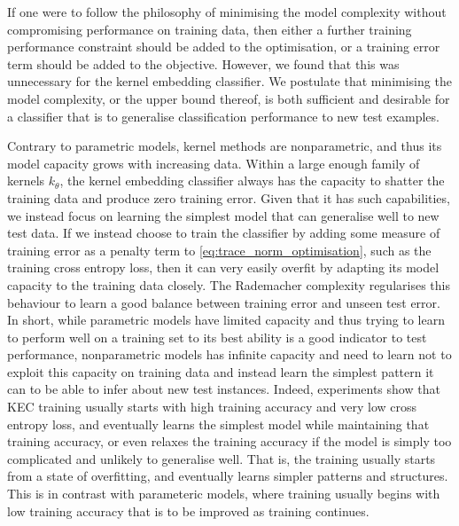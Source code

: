 \documentclass{article}
\begin{document}
	If one were to follow the philosophy of minimising the model complexity without compromising performance on training data, then either a further training performance constraint should be added to the optimisation, or a training error term should be added to the objective. However, we found that this was unnecessary for the kernel embedding classifier. We postulate that minimising the model complexity, or the upper bound thereof, is both sufficient and desirable for a classifier that is to generalise classification performance to new test examples.

	Contrary to parametric models, kernel methods are nonparametric, and thus its model capacity grows with increasing data. Within a large enough family of kernels $k_{\theta}$, the kernel embedding classifier always has the capacity to shatter the training data and produce zero training error. Given that it has such capabilities, we instead focus on learning the simplest model that can generalise well to new test data. If we instead choose to train the classifier by adding some measure of training error as a penalty term to \eqref{eq:trace_norm_optimisation}, such as the training cross entropy loss, then it can very easily overfit by adapting its model capacity to the training data closely. The Rademacher complexity regularises this behaviour to learn a good balance between training error and unseen test error. In short, while parametric models have limited capacity and thus trying to learn to perform well on a training set to its best ability is a good indicator to test performance, nonparametric models has infinite capacity and need to learn not to exploit this capacity on training data and instead learn the simplest pattern it can to be able to infer about new test instances. Indeed, experiments show that KEC training usually starts with high training accuracy and very low cross entropy loss, and eventually learns the simplest model while maintaining that training accuracy, or even relaxes the training accuracy if the model is simply too complicated and unlikely to generalise well. That is, the training usually starts from a state of overfitting, and eventually learns simpler patterns and structures. This is in contrast with parameteric models, where training usually begins with low training accuracy that is to be improved as training continues.
	
\end{document}

